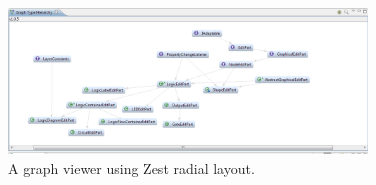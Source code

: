 \begin{figure}[ht] \centering
\includegraphics[width=0.85\textwidth]{img/relatedwork/zest.png}
\caption{A graph viewer using Zest radial layout.\protect\footnotemark} \end{figure}
